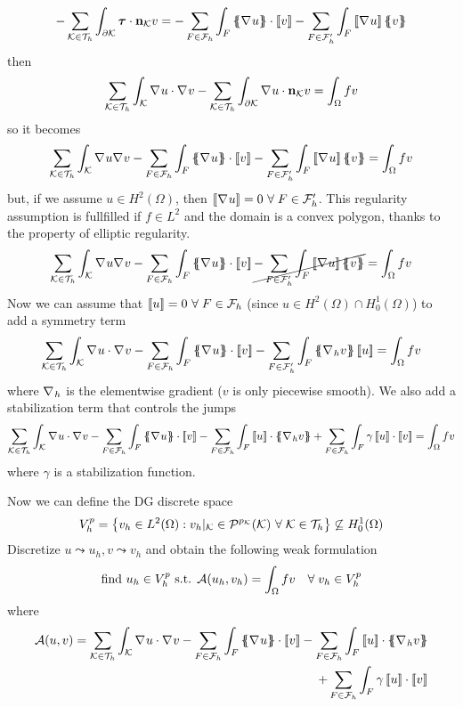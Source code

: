\[
    -\sum_{\element \in \triangulation} \int_{\partial\element} \bm{\tau} \cdot \vect{n}_{\element} v =- \sum_{F \in \mathcal{F}_h}\int_F\average{\grad u} \cdot \jump{v} - \sum_{F \in \mathcal{F}'_h} \int_{F}\jump{\grad u}\average{v} 
\]
then 
\[
    \sum_{\mathcal{K} \in \mathcal{T}_h} \int_{\mathcal{K}}\nabla\mspace{1mu} u \cdot \nabla\mspace{1mu} v - \sum_{\mathcal{K} \in \mathcal{T}_h} \int_{\partial\mathcal{K}} \nabla\mspace{1mu} u \cdot \textbf{n}_{\mathcal{K}} v = \int_{\Omega} fv
\]
so it becomes 
\[
    \sum_{\element \in \triangulation} \int_{\element} \grad u \grad v - \sum_{F \in \mathcal{F}_h} \int_{F} \average{\grad u} \cdot \jump{v} - \sum_{F \in \mathcal{F}'_h} \int_F \jump{\grad u} \average{v} = \int_{\Omega} fv
\]
but, if we assume \(u \in H^2(\Omega)\), then \(\left[\!\left[\nabla\mspace{1mu} u\right]\!\right] = 0 \ \forall \; F \in \mathcal{F}'_h\). This regularity assumption is fullfilled if \(f \in L^2\) and the domain is a convex polygon, thanks to the property of elliptic regularity.
\[
    \sum_{\element \in \triangulation} \int_{\element} \grad u \grad v - \sum_{F \in \mathcal{F}_h} \int_{F} \average{\grad u} \cdot \jump{v} \cancel{- \sum_{F \in \mathcal{F}'_h} \int_F \jump{\grad u} \average{v}} = \int_{\Omega} fv
\]
Now we can assume that \(\left[\!\left[u\right]\!\right] = 0 \ \forall \; F \in \mathcal{F}_h\) (since \(u \in H^2(\Omega) \cap H^1_0(\Omega)\)) to add a symmetry term 
\[
    \sum_{\element \in \triangulation} \int_\element \grad u \cdot \grad v - \sum_{F \in \mathcal{F}_h} \int_F \average{\grad u} \cdot \jump{v} - \sum_{F \in \mathcal{F}'_h} \int_F \average{\grad_h v} \jump{u} = \int_\Omega fv
\] 
where \(\nabla\mspace{1mu}_h\) is the elementwise gradient (\(v\) is only piecewise smooth).
We also add a stabilization term that controls the jumps
\[
    \sum_{\element \in \triangulation} \int_\element \grad u \cdot \grad v  - \sum_{F \in \mathcal{F}_h} \int_F \average{\grad u} \cdot \jump{v} - \sum_{F \in \mathcal{F}_h} \int_F \jump{u} \cdot \average{\grad_h v} + \sum_{F \in \mathcal{F}_h} \int_F \gamma \jump{u} \cdot \jump{v} = \int_\Omega fv
\]
where \(\gamma\) is a stabilization function.

Now we can define the DG discrete space 
\[
    V_h^p = \left\{ v_h \in L^2(\Omega) : v_h\vert_{\mathcal{K}} \in \mathcal{P}^{p_{\mathcal{K}}}(\mathcal{K}) \ \forall \; \mathcal{K} \in \mathcal{T}_h\right\} \not\subseteq H^1_0 (\Omega)
\]
Discretize \(u \leadsto u_h, v \leadsto v_h\) and obtain the following weak formulation
\[
    \text{find } u_h \in V_h^p \text{ s.t. } \mathcal{A}(u_h, v_h) = \int_\Omega fv \quad \forall \;v_h \in V_h^p
\]
where 
\begin{equation*}
    \begin{split}
        \mathcal{A}(u, v) =  \sum_{\element \in \triangulation} \int_\element \grad u \cdot \grad v  - \sum_{F \in \mathcal{F}_h} \int_F \average{\grad u} \cdot \jump{v}  - \sum_{F \in \mathcal{F}_h} \int_F \jump{u} \cdot \average{\grad_h v} \\+ \sum_{F \in \mathcal{F}_h} \int_F \gamma \jump{u} \cdot \jump{v}
    \end{split}
\end{equation*}
